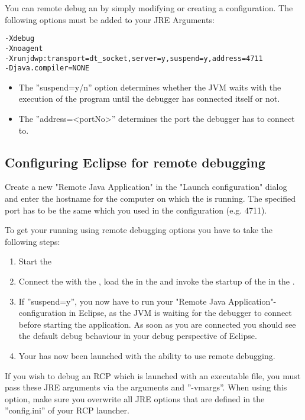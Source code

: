 You can remote debug an \gdaut{} by simply modifying or creating a \gdaut{} configuration. The following options must be added to your JRE Arguments:

\begin{verbatim}
-Xdebug 
-Xnoagent 
-Xrunjdwp:transport=dt_socket,server=y,suspend=y,address=4711 
-Djava.compiler=NONE 
\end{verbatim}

\begin{itemize}
 \item The ''suspend=y/n'' option determines whether the JVM waits with the execution of the program until the debugger has connected itself or not.
 \item The ''address=<portNo>'' determines the port the debugger has to connect to.
\end{itemize}


\subsection{Configuring Eclipse for remote debugging}
Create a new "Remote Java Application" in the "Launch configuration" dialog 
and enter the hostname for the computer on which the \gdagent{} is running. The specified port has to be the same which you used in the \gdaut{} configuration (e.g. 4711).

To get your \gdaut{} running using remote debugging options you have to take the following steps:
\begin{enumerate}
 \item Start the \gdagent{}
 \item Connect the \ite{} with the \gdagent{}, load the \gdproject{} in the \ite{} and invoke the startup of the \gdaut{} in the \ite{}.
 \item If ''suspend=y'', you now have to run your "Remote Java Application"-configuration 
 in Eclipse, as the JVM is waiting for the debugger to connect before starting the 
 application. As soon as you are connected you should see the default debug behaviour in your
 debug perspective of Eclipse.
 \item Your \gdaut{} has now been launched with the ability to use remote debugging.  
\end{enumerate}

If you wish to debug an RCP \gdaut{}  which is launched with an 
executable file, you must pass these JRE arguments via the \gdaut{} arguments and ''-vmargs''. When using this option, make sure you overwrite all JRE options that are defined in the ''config.ini'' of your RCP launcher.
